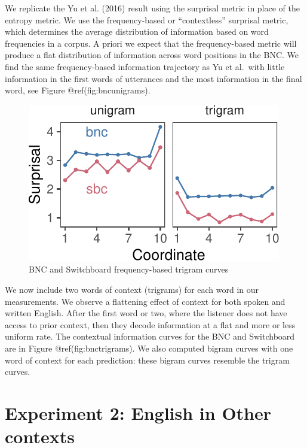 \documentclass[10pt, letterpaper]{article}
\newenvironment{CodeChunk}{}{}
\begin{document}
We replicate the Yu et al. (2016) result using the surprisal metric in
place of the entropy metric. We use the frequency-based or
``contextless'' surprisal metric, which determines the average
distribution of information based on word frequencies in a corpus. A
priori we expect that the frequency-based metric will produce a flat
distribution of information across word positions in the BNC. We find
the same frequency-based information trajectory as Yu et al.~with little
information in the first words of utterances and the most information in
the final word, see Figure @ref(fig:bncunigrams).

\begin{CodeChunk}
\begin{figure}[tb]
\includegraphics{figs/bncunigrams-1} \caption[BNC and Switchboard frequency-based trigram curves]{BNC and Switchboard frequency-based trigram curves}\label{fig:bncunigrams}
\end{figure}
\end{CodeChunk}

We now include two words of context (trigrams) for each word in our
measurements. We observe a flattening effect of context for both spoken
and written English. After the first word or two, where the listener
does not have access to prior context, then they decode information at a
flat and more or less uniform rate. The contextual information curves
for the BNC and Switchboard are in Figure @ref(fig:bnctrigrams). We also
computed bigram curves with one word of context for each prediction:
these bigram curves resemble the trigram curves.

\hypertarget{experiment-2-english-in-other-contexts}{%
\section{Experiment 2: English in Other
contexts}\label{experiment-2-english-in-other-contexts}}
\end{document}
